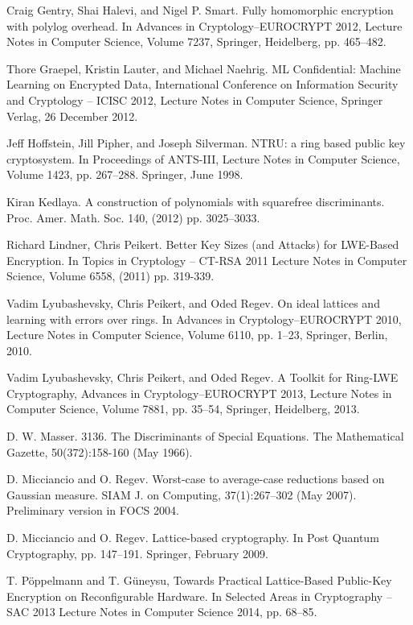 \documentclass{llncs}
\newcommand{\<}{\langle}
\renewcommand{\>}{\rangle}
\begin{document}
\begin{thebibliography}{BBCE10}
 Craig Gentry, Shai Halevi, and Nigel P. Smart. Fully homomorphic encryption with polylog overhead. In Advances in Cryptology--EUROCRYPT 2012, 
Lecture Notes in Computer Science, Volume 7237, Springer, Heidelberg, pp. 465--482.


 Thore Graepel, Kristin Lauter, and Michael Naehrig. ML Confidential: Machine Learning on Encrypted Data,  International Conference on Information Security and Cryptology -- ICISC 2012, Lecture Notes in Computer Science, Springer Verlag, 26 December 2012.


 Jeff Hoffstein, Jill Pipher, and Joseph Silverman. NTRU: a ring based public key cryptosystem. In Proceedings of ANTS-III,  Lecture Notes in Computer Science, Volume 1423, pp. 267--288. Springer, June 1998.

 Kiran Kedlaya. A construction of polynomials with squarefree discriminants. Proc. Amer. Math. Soc. 140, (2012) pp. 3025--3033.


 Richard Lindner, Chris Peikert. Better Key Sizes (and Attacks) for LWE-Based Encryption. In Topics in Cryptology -- CT-RSA 2011
Lecture Notes in Computer Science, Volume 6558, (2011) pp. 319-339.

Vadim Lyubashevsky, Chris Peikert, and Oded Regev.
\newblock On ideal lattices and learning with errors over rings. In Advances in Cryptology--EUROCRYPT 2010,  Lecture Notes in Computer Science, Volume 6110, pp. 1--23, Springer, Berlin, 2010.

Vadim Lyubashevsky, Chris Peikert, and Oded Regev.
A Toolkit for Ring-LWE Cryptography, Advances in Cryptology--EUROCRYPT 2013, 
Lecture Notes in Computer Science, Volume 7881, pp. 35--54, Springer, Heidelberg, 2013.

D. W. Masser.
3136. The Discriminants of Special Equations.
The Mathematical Gazette, 50(372):158-160 (May 1966).

 D. Micciancio and O. Regev.
Worst-case to average-case reductions based on Gaussian measure.
SIAM J. on Computing, 37(1):267--302 (May 2007).
Preliminary version in FOCS 2004.

 D. Micciancio and O. Regev. Lattice-based cryptography. In Post Quantum Cryptography, pp. 147--191. Springer, February 2009.

 T. P\"{o}ppelmann and T. G\"{u}neysu, Towards Practical Lattice-Based Public-Key Encryption on Reconfigurable Hardware. In Selected Areas in Cryptography -- SAC 2013
Lecture Notes in Computer Science 2014, pp. 68--85.


\end{thebibliography}
\end{document}
